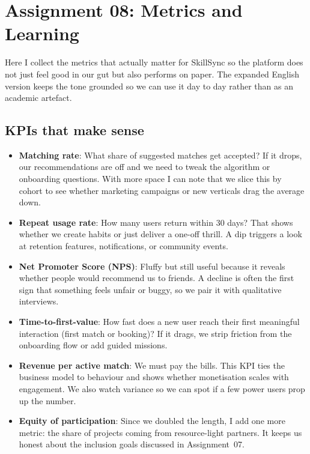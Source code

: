 \section*{Assignment 08: Metrics and Learning}

Here I collect the metrics that actually matter for SkillSync so the platform does not just feel good in our gut but also performs on paper. The expanded English version keeps the tone grounded so we can use it day to day rather than as an academic artefact.

\subsection*{KPIs that make sense}
\begin{itemize}
    \item \textbf{Matching rate}: What share of suggested matches get accepted? If it drops, our recommendations are off and we need to tweak the algorithm or onboarding questions. With more space I can note that we slice this by cohort to see whether marketing campaigns or new verticals drag the average down.
    \item \textbf{Repeat usage rate}: How many users return within 30 days? That shows whether we create habits or just deliver a one-off thrill. A dip triggers a look at retention features, notifications, or community events.
    \item \textbf{Net Promoter Score (NPS)}: Fluffy but still useful because it reveals whether people would recommend us to friends. A decline is often the first sign that something feels unfair or buggy, so we pair it with qualitative interviews.
    \item \textbf{Time-to-first-value}: How fast does a new user reach their first meaningful interaction (first match or booking)? If it drags, we strip friction from the onboarding flow or add guided missions.
    \item \textbf{Revenue per active match}: We must pay the bills. This KPI ties the business model to behaviour and shows whether monetisation scales with engagement. We also watch variance so we can spot if a few power users prop up the number.
    \item \textbf{Equity of participation}: Since we doubled the length, I add one more metric: the share of projects coming from resource-light partners. It keeps us honest about the inclusion goals discussed in Assignment~07.
\end{itemize}

